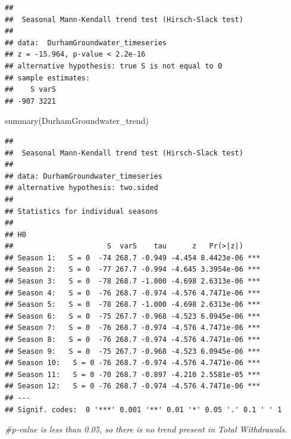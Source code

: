 \documentclass[
  12pt,
]{article}
\newenvironment{Shaded}{\begin{snugshade}}{\end{snugshade}}
\newcommand{\AttributeTok}[1]{\textcolor[rgb]{0.77,0.63,0.00}{#1}}
\newcommand{\CommentTok}[1]{\textcolor[rgb]{0.56,0.35,0.01}{\textit{#1}}}
\newcommand{\DecValTok}[1]{\textcolor[rgb]{0.00,0.00,0.81}{#1}}
\newcommand{\FunctionTok}[1]{\textcolor[rgb]{0.00,0.00,0.00}{#1}}
\newcommand{\NormalTok}[1]{#1}
\newcommand{\OtherTok}[1]{\textcolor[rgb]{0.56,0.35,0.01}{#1}}
\newcommand{\SpecialCharTok}[1]{\textcolor[rgb]{0.00,0.00,0.00}{#1}}
\newcommand{\StringTok}[1]{\textcolor[rgb]{0.31,0.60,0.02}{#1}}
\begin{document}
\begin{verbatim}
## 
##  Seasonal Mann-Kendall trend test (Hirsch-Slack test)
## 
## data:  DurhamGroundwater_timeseries
## z = -15.964, p-value < 2.2e-16
## alternative hypothesis: true S is not equal to 0
## sample estimates:
##    S varS 
## -907 3221
\end{verbatim}

\begin{Shaded}
\begin{Highlighting}[]
\FunctionTok{summary}\NormalTok{(DurhamGroundwater\_trend)}
\end{Highlighting}
\end{Shaded}

\begin{verbatim}
## 
##  Seasonal Mann-Kendall trend test (Hirsch-Slack test)
## 
## data: DurhamGroundwater_timeseries
## alternative hypothesis: two.sided
## 
## Statistics for individual seasons
## 
## H0
##                      S  varS    tau      z   Pr(>|z|)    
## Season 1:   S = 0  -74 268.7 -0.949 -4.454 8.4423e-06 ***
## Season 2:   S = 0  -77 267.7 -0.994 -4.645 3.3954e-06 ***
## Season 3:   S = 0  -78 268.7 -1.000 -4.698 2.6313e-06 ***
## Season 4:   S = 0  -76 268.7 -0.974 -4.576 4.7471e-06 ***
## Season 5:   S = 0  -78 268.7 -1.000 -4.698 2.6313e-06 ***
## Season 6:   S = 0  -75 267.7 -0.968 -4.523 6.0945e-06 ***
## Season 7:   S = 0  -76 268.7 -0.974 -4.576 4.7471e-06 ***
## Season 8:   S = 0  -76 268.7 -0.974 -4.576 4.7471e-06 ***
## Season 9:   S = 0  -75 267.7 -0.968 -4.523 6.0945e-06 ***
## Season 10:   S = 0 -76 268.7 -0.974 -4.576 4.7471e-06 ***
## Season 11:   S = 0 -70 268.7 -0.897 -4.210 2.5581e-05 ***
## Season 12:   S = 0 -76 268.7 -0.974 -4.576 4.7471e-06 ***
## ---
## Signif. codes:  0 '***' 0.001 '**' 0.01 '*' 0.05 '.' 0.1 ' ' 1
\end{verbatim}

\begin{Shaded}
\begin{Highlighting}[]
\CommentTok{\#p{-}value is less than 0.05, so there is no trend present in Total Withdrawals.}
\end{Highlighting}
\end{Shaded}

\begin{Shaded}
\end{Shaded}
\end{document}

